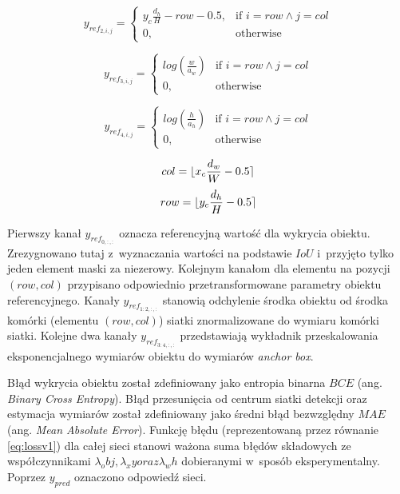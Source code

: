 \begin{equation}
y_{ref}_{2,i,j} = 
\begin{cases}
    y_c \frac{d_h}{H} - row - 0.5, & \text{if }  i = row \land j = col \\
    0,              & \text{otherwise}
\end{cases}
\label{eq:y_ref_yv1}
\end{equation}

\begin{equation}
y_{ref}_{3,i,j} = 
\begin{cases}
    log(\frac{w}{a_w}) & \text{if }  i = row \land j = col \\
    0,              & \text{otherwise}
\end{cases}
\label{eq:y_ref_wv1}
\end{equation}

\begin{equation}
y_{ref}_{4,i,j} = 
\begin{cases}
    log(\frac{h}{a_h}) & \text{if }  i = row \land j = col \\
    0,              & \text{otherwise}
\end{cases}
\label{eq:y_ref_hv1}
\end{equation}

\begin{equation}
col = \lfloor x_c \frac{d_w}{W} - 0.5\rceil
\label{eq:colv1}
\end{equation}
\begin{equation}
row = \lfloor y_c \frac{d_h}{H} - 0.5\rceil
\label{eq:rowv1}
\end{equation}


Pierwszy kanał $y_{ref}_{0,:,:}$ oznacza referencyjną wartość dla wykrycia obiektu.
Zrezygnowano tutaj z~wyznaczania wartości na podstawie $IoU$ i~przyjęto tylko jeden element maski za niezerowy. 
Kolejnym kanałom dla elementu na pozycji $(row, col)$ przypisano odpowiednio przetransformowane parametry obiektu referencyjnego. Kanały $y_{ref}_{1:2,:,:}$ stanowią odchylenie środka obiektu od środka komórki (elementu $(row, col)$) siatki znormalizowane do wymiaru komórki siatki.
Kolejne dwa kanały $y_{ref}_{3:4,:,:}$ przedstawiają wykładnik przeskalowania eksponencjalnego wymiarów obiektu do wymiarów \emph{anchor box}.

Błąd wykrycia obiektu został zdefiniowany jako entropia binarna $BCE$ (ang. \emph{Binary Cross Entropy}). 
Błąd przesunięcia od centrum siatki detekcji oraz estymacja wymiarów został zdefiniowany jako średni błąd bezwzględny $MAE$ (ang. \emph{Mean Absolute Error}).
Funkcję błędu (reprezentowaną przez równanie \eqref{eq:lossv1}) dla całej sieci stanowi ważona suma błędów składowych ze współczynnikami $\lambda_obj, \lambda_xy oraz \lambda_wh$ dobieranymi w~sposób eksperymentalny. 
Poprzez $y_{pred}$ oznaczono odpowiedź sieci. 

